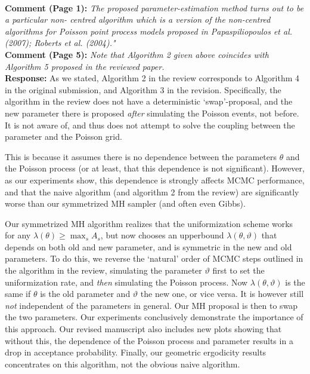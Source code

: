 \documentclass[11pt]{article}
\newcommand{\rev}[2]{\textbf{Comment #1: }\emph{#2}}
\newcommand{\resp}{\textbf{Response: }}
\begin{document}
~\\
\rev{(Page 1)}{The proposed parameter-estimation method turns out to be a particular non- centred algorithm which is a version of the non-centred algorithms for Poisson point process models proposed in Papaspiliopoulos et al. (2007); Roberts et al.  (2004)."}\\
\rev {(Page 5)}{Note that Algorithm 2 given above coincides with Algorithm 5 proposed in the reviewed paper.}\\
\resp
As we stated, Algorithm 2 in the review corresponds to Algorithm 4 in the original submission, and Algorithm 3 in the revision. Specifically, the algorithm in the review does not have a deterministic `swap'-proposal, and the new parameter there is proposed {\em after} simulating the Poisson events, not before. It is not aware of, and thus does not attempt to solve the coupling between the parameter and the Poisson grid.

This is because it assumes there is no dependence between the parameters $\theta$ and the Poisson process (or at least, that this dependence is not significant). However, as our experiments show, this dependence is strongly affects MCMC performance, and that the  naive algorithm (and algorithm 2 from the review) are significantly worse than our symmetrized MH sampler (and often even Gibbs).

Our symmetrized MH algorithm  realizes that the uniformization scheme works for any $\lambda(\theta) \ge \max_s A_s$, but now chooses an upperbound $\lambda(\theta, \vartheta)$ that depends on both old and new parameter, and is symmetric in the new and old parameters. 
To do this, we reverse the `natural' order of MCMC steps outlined in the algorithm in the review, simulating the parameter $\vartheta$ first to set the uniformization rate, and \emph{then} simulating the Poisson process. 
Now $\lambda(\theta,\vartheta)$ is the same if $\theta$ is the old parameter and $\vartheta$ the new one, or vice versa. It is however still \emph{not} independent of the parameters in general.
Our MH proposal is then to swap the two parameters. 
Our experiments conclusively demonstrate the importance of this approach. Our revised manuscript also includes new plots showing that without this, the dependence of the Poisson process and parameter results in a drop in acceptance probability. Finally, our geometric ergodicity results concentrates on this algorithm, not the obvious naive algorithm.
\end{document}
